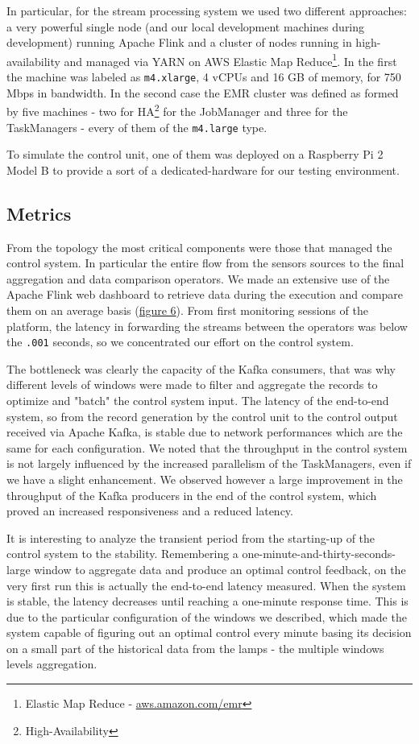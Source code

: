 In particular, for the stream processing system we used two different approaches: a very powerful single node (and our local development machines during development) running Apache Flink and a cluster of nodes running in high-availability and managed via YARN on AWS Elastic Map Reduce\footnote{Elastic Map Reduce - \url{aws.amazon.com/emr}}. In the first the machine was labeled as \texttt{m4.xlarge}, 4 vCPUs and 16 GB of memory, for 750 Mbps in bandwidth. In the second case the EMR cluster was defined as formed by five machines - two for HA\footnote{High-Availability} for the JobManager and three for the TaskManagers -  every of them of the \texttt{m4.large} type.

To simulate the control unit, one of them was deployed on a Raspberry Pi 2 Model B to provide a sort of a dedicated-hardware for our testing environment.

\subsection{Metrics}
From the topology the most critical components were those that managed the control system. In particular the entire flow from the sensors sources to the final aggregation and data comparison operators. We made an extensive use of the Apache Flink web dashboard to retrieve data during the execution and compare them on an average basis (\hyperref[fig:ember_metrics]{figure 6}). From first monitoring sessions of the platform, the latency in forwarding the streams between the operators was below the \texttt{.001} seconds, so we concentrated our effort on the control system. 

The bottleneck was clearly the capacity of the Kafka consumers, that was why different levels of windows were made to filter and aggregate the records to optimize and "batch" the control system input. The latency of the end-to-end system, so from the record generation by the control unit to the control output received via Apache Kafka, is stable due to network performances which are the same for each configuration. We noted that the throughput in the control system is not largely influenced by the increased parallelism of the TaskManagers, even if we have a slight enhancement. We observed however a large improvement in the throughput of the Kafka producers in the end of the control system, which proved an increased responsiveness and a reduced latency. 

It is interesting to analyze the transient period from the starting-up of the control system to the stability. Remembering a one-minute-and-thirty-seconds-large window to aggregate data and produce an optimal control feedback, on the very first run this is actually the end-to-end latency measured. When the system is stable, the latency decreases until reaching a one-minute response time. This is due to the particular configuration of the windows we described, which made the system capable of figuring out an optimal control every minute basing its decision on a small part of the historical data from the lamps - the multiple windows levels aggregation.


